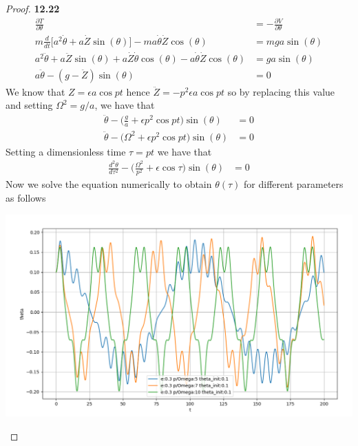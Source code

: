 \documentclass[11pt]{article}
\theoremstyle{definition}
\begin{document}
\begin{proof}{\textbf{12.22}}
\begin{align*}
        \frac{\partial T}{\partial \theta}
        &= -\frac{\partial V}{\partial \theta}\\
        m\frac{d}{dt}\bigg[
            a^2\dot{\theta}
        + a\dot{Z}\sin(\theta)
        \bigg] - ma\dot{\theta}\dot{Z}\cos(\theta)
        &= mga\sin(\theta)\\      
        a^2\ddot{\theta} + a\ddot{Z}\sin(\theta) + a\dot{Z}\dot\theta\cos(\theta)
        - a\dot{\theta}\dot{Z}\cos(\theta)
        &= ga\sin(\theta)\\
        a\ddot{\theta} - (g - \ddot{Z})\sin(\theta) &= 0
    \end{align*}
    We know that $Z = \epsilon a\cos pt$ hence $\ddot{Z} = -p^2\epsilon a\cos pt$
    so by replacing this value and setting $\Omega^2 = g/a$, we have that
    \begin{align*}
        \ddot{\theta}
        - \bigg(\frac{g}{a} + \epsilon p^2 \cos pt\bigg)\sin(\theta) &= 0\\
        \ddot{\theta}
        - \bigg(\Omega^2 + \epsilon p^2 \cos pt\bigg)\sin(\theta) &= 0
    \end{align*}
    Setting a dimensionless time $\tau = pt$ we have that
    \begin{align*}
        \frac{d^2\theta}{d\tau^2}
        - \bigg(\frac{\Omega^2}{p^2} + \epsilon \cos \tau\bigg)\sin(\theta) &= 0
    \end{align*}
    Now we solve the equation numerically to obtain $\theta(\tau)$ for
    different parameters as follows
    \begin{center}
        \includegraphics[scale=0.43]{ch12-22-1.png}
    \end{center}
\end{proof}
\end{document}
